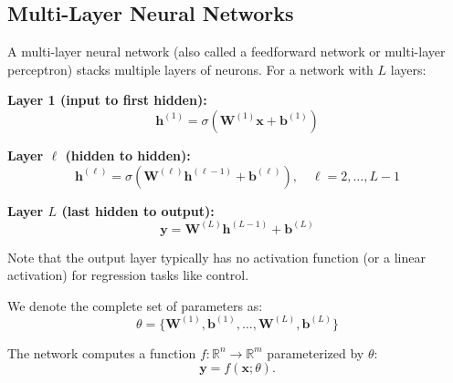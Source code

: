 \subsection{Multi-Layer Neural Networks}

A multi-layer neural network (also called a feedforward network or multi-layer perceptron) stacks multiple layers of neurons. For a network with $L$ layers:

\textbf{Layer 1 (input to first hidden):}
\begin{equation}
\mathbf{h}^{(1)} = \sigma(\mathbf{W}^{(1)}\mathbf{x} + \mathbf{b}^{(1)})
\end{equation}

\textbf{Layer $\ell$ (hidden to hidden):}
\begin{equation}
\mathbf{h}^{(\ell)} = \sigma(\mathbf{W}^{(\ell)}\mathbf{h}^{(\ell-1)} + \mathbf{b}^{(\ell)}), \quad \ell = 2, \ldots, L-1
\end{equation}

\textbf{Layer $L$ (last hidden to output):}
\begin{equation}
\mathbf{y} = \mathbf{W}^{(L)}\mathbf{h}^{(L-1)} + \mathbf{b}^{(L)}
\end{equation}

Note that the output layer typically has no activation function (or a linear activation) for regression tasks like control.

We denote the complete set of parameters as:
\begin{equation}
\theta = \{\mathbf{W}^{(1)}, \mathbf{b}^{(1)}, \ldots, \mathbf{W}^{(L)}, \mathbf{b}^{(L)}\}
\end{equation}

The network computes a function $f: \mathbb{R}^n \to \mathbb{R}^m$ parameterized by $\theta$:
\begin{equation}
\mathbf{y} = f(\mathbf{x}; \theta).
\end{equation}

